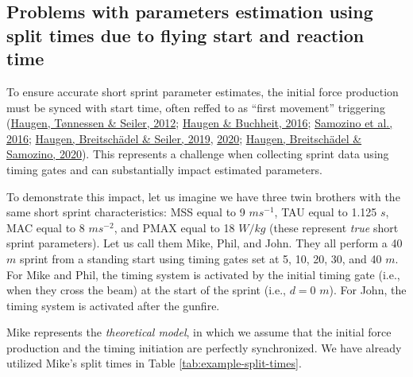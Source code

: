 \documentclass[fleqn,10pt,lineno]{wlpeerj} %
\begin{document}
\hypertarget{problems-with-parameters-estimation-using-split-times-due-to-flying-start-and-reaction-time}{%
\subsection{Problems with parameters estimation using split times due to flying start and reaction time}\label{problems-with-parameters-estimation-using-split-times-due-to-flying-start-and-reaction-time}}

To ensure accurate short sprint parameter estimates, the initial force production must be synced with start time, often reffed to as ``first movement'' triggering (\protect\hyperlink{ref-haugenDifferenceStartImpact2012}{Haugen, Tønnessen \& Seiler, 2012}; \protect\hyperlink{ref-haugenSprintRunningPerformance2016}{Haugen \& Buchheit, 2016}; \protect\hyperlink{ref-samozinoSimpleMethodMeasuring2016}{Samozino et al., 2016}; \protect\hyperlink{ref-haugenSprintMechanicalVariables2019}{Haugen, Breitschädel \& Seiler, 2019}, \protect\hyperlink{ref-haugenSprintMechanicalProperties2020}{2020}; \protect\hyperlink{ref-haugenPowerForceVelocityProfilingSprinting2020}{Haugen, Breitschädel \& Samozino, 2020}). This represents a challenge when collecting sprint data using timing gates and can substantially impact estimated parameters.

To demonstrate this impact, let us imagine we have three twin brothers with the same short sprint characteristics: MSS equal to 9 \(ms^{-1}\), TAU equal to 1.125 \(s\), MAC equal to 8 \(ms^{-2}\), and PMAX equal to 18 \(W/kg\) (these represent \emph{true} short sprint parameters). Let us call them Mike, Phil, and John. They all perform a 40 \(m\) sprint from a standing start using timing gates set at 5, 10, 20, 30, and 40 \(m\). For Mike and Phil, the timing system is activated by the initial timing gate (i.e., when they cross the beam) at the start of the sprint (i.e., \(d=0\) \(m\)). For John, the timing system is activated after the gunfire.

Mike represents the \emph{theoretical model}, in which we assume that the initial force production and the timing initiation are perfectly synchronized. We have already utilized Mike's split times in Table \ref{tab:example-split-times}.
\end{document}
